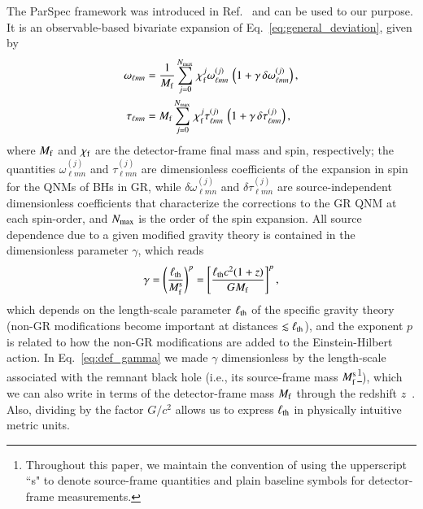 \documentclass[twocolumn,
               prd,
               aps,
               superscriptaddress,
               tightenlines,
               nofootinbib,
               eqsecnum,
               amsfonts,
               amsmath,
               longbibliography]{revtex4-1}
\newcommand\redsout{\bgroup\markoverwith{\textcolor{red}{\rule[0.5ex]{8pt}{1pt}}}\ULon} %
\begin{document}
The ParSpec framework was introduced in Ref.~\cite{Maselli:2019mjd} and can be
used to our purpose. It is an observable-based bivariate expansion of
Eq.~\eqref{eq:general_deviation}, given by
%
\begin{subequations}
\label{eq:kerr_expansion}
\begin{align}
\omega_{\ell m n} &= \frac{1}{M_{\rm f}} \sum_{j = 0}^{N_{\rm max}} \, \chi_{\rm f}^{j} \omega^{(j)}_{\ell m n} \, \left( 1 + \gamma\, \delta \omega^{(j)}_{\ell m n} \right), \\
\tau_{\ell m n}   &= M_{\rm f}     \sum_{j = 0}^{N_{\rm max}} \, \chi_{\rm f}^{j} \tau^{(j)}_{\ell m n}   \, \left( 1 + \gamma\, \delta \tau^{(j)}_{\ell m n} \right),
\end{align}
\end{subequations}
%
where $M_{\rm f}$ and $\chi_{\rm f}$ are the detector-frame final mass and spin, respectively;
the quantities $\omega_{\ell m n}^{(j)}$ and $\tau_{\ell m n}^{(j)}$ are dimensionless coefficients of the
expansion in spin for the QNMs of BHs in GR, while $\delta\omega_{\ell m n}^{(j)}$ and $\delta\tau_{\ell m n}^{(j)}$ are
source-independent dimensionless coefficients that characterize the corrections to the GR QNM at
each spin-order,
%
and $N_{\rm max}$ is the order of the spin expansion.
%
All source dependence due to a given modified gravity theory is contained in the
dimensionless parameter $\gamma$, which reads
%
\begin{equation}
\gamma
%
= \left(\frac{\ell_{\rm th}}{M^{\rm s}_{\rm f}}\right)^{p}
%
= \left[
\frac{\ell_{\rm th} c^2 (1 + z)}{G M_{\rm f}}
\right]^{p},
\label{eq:def_gamma}
\end{equation}
%
which depends on the length-scale parameter $\ell_{\rm th}$ of the specific gravity theory
(non-GR modifications become important at distances $\lesssim \ell_{\rm th}$), and
the exponent $p$ is related to how the non-GR modifications are
added to the Einstein-Hilbert action.
%
In Eq.~\eqref{eq:def_gamma} we made $\gamma$ dimensionless by \redsout{using} the \redsout{other}
length-scale associated with the remnant black hole (i.e., its source-frame mass
$M^{\rm s}_{\rm f}$\footnote{Throughout this paper, we maintain the convention of
using the upperscript ``s" to denote source-frame quantities and plain baseline
symbols for detector-frame measurements.}), which we can also write in terms of the detector-frame mass $M_{\rm f}$
through the redshift $z$~\cite{Krolak:1987ofj}. Also, dividing by the factor $G/c^2$ allows us to
express $\ell_{\rm th}$ in physically intuitive metric units.
\end{document}
